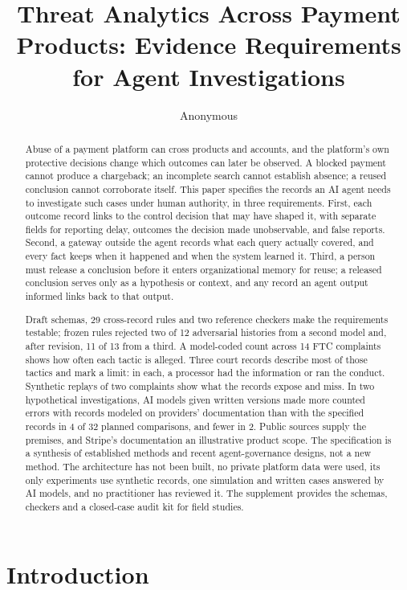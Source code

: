 \documentclass[acmlarge,review,anonymous,nonacm]{acmart}
\begin{document}
\title{Threat Analytics Across Payment Products: Evidence Requirements
for Agent Investigations}
\author{Anonymous}
\begin{abstract}
Abuse of a payment platform can cross products and accounts, and the
platform's own protective decisions change which outcomes can later be
observed. A blocked payment cannot produce a chargeback; an incomplete
search cannot establish absence; a reused conclusion cannot corroborate
itself. This paper specifies the records an AI agent needs to
investigate such cases under human authority, in three requirements.
First, each outcome record links to the control decision that may have
shaped it, with separate fields for reporting delay, outcomes the
decision made unobservable, and false reports. Second, a gateway outside
the agent records what each query actually covered, and every fact keeps
when it happened and when the system learned it. Third, a person must
release a conclusion before it enters organizational memory for reuse; a
released conclusion serves only as a hypothesis or context, and any
record an agent output informed links back to that output.

Draft schemas, 29 cross-record rules and two reference checkers make the
requirements testable; frozen rules rejected two of 12 adversarial
histories from a second model and, after revision, 11 of 13 from a
third. A model-coded count across 14 FTC complaints shows how often each
tactic is alleged. Three court records describe most of those tactics
and mark a limit: in each, a processor had the information or ran the
conduct. Synthetic replays of two complaints show what the records
expose and miss. In two hypothetical investigations, AI models given
written versions made more counted errors with records modeled on
providers' documentation than with the specified records in 4 of 32
planned comparisons, and fewer in 2. Public sources supply the premises,
and Stripe's documentation an illustrative product scope. The
specification is a synthesis of established methods and recent
agent-governance designs, not a new method. The architecture has not
been built, no private platform data were used, its only experiments use
synthetic records, one simulation and written cases answered by AI
models, and no practitioner has reviewed it. The supplement provides the
schemas, checkers and a closed-case audit kit for field studies.
\end{abstract}
\maketitle
\hypertarget{introduction}{%
\section{Introduction}\label{introduction}}
\end{document}
